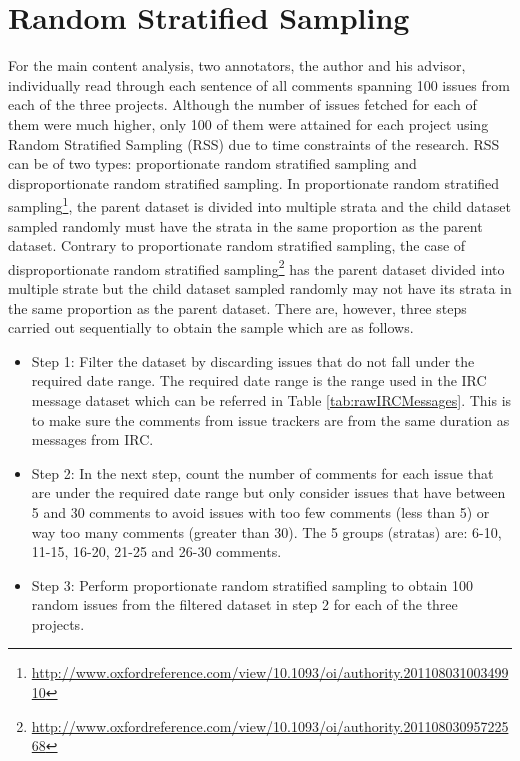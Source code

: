 \documentclass[a4paper,12pt,twoside]{report}
\begin{document}
\section{Random Stratified Sampling}
For the main content analysis, two annotators, the author and his advisor, individually read through each sentence of all comments spanning 100 issues from each of the three projects. Although the number of issues fetched for each of them were much higher, only 100 of them were attained for each project using Random Stratified Sampling (RSS) due to time constraints of the research. RSS can be of two types: proportionate random stratified sampling and disproportionate random stratified sampling. In proportionate random stratified sampling\footnote{\url{http://www.oxfordreference.com/view/10.1093/oi/authority.20110803100349910}}, the parent dataset is divided into multiple strata and the child dataset sampled randomly must have the strata in the same proportion as the parent dataset. Contrary to proportionate random stratified sampling, the case of disproportionate random stratified sampling\footnote{\url{http://www.oxfordreference.com/view/10.1093/oi/authority.20110803095722568}} has the parent dataset divided into multiple strate but the child dataset sampled randomly may not have its strata in the same proportion as the parent dataset. There are, however, three steps carried out sequentially to obtain the sample which are as follows.
\newline 
\begin{itemize}
\item {Step 1:} Filter the dataset by discarding issues that do not fall under the required date range. The required date range is the range used in the \acs{IRC} message dataset which can be referred in Table \ref{tab:rawIRCMessages}. This is to make sure the comments from issue trackers are from the same duration as messages from \acs{IRC}. 
\item {Step 2:} In the next step, count the number of comments for each issue that are under the required date range but only consider issues that have between 5 and 30 comments to avoid issues with too few comments (less than 5) or way too many comments (greater than 30). The 5 groups (stratas) are: 6-10, 11-15, 16-20, 21-25 and 26-30 comments.
\item {Step 3:} Perform proportionate random stratified sampling to obtain 100 random issues from the filtered dataset in step 2 for each of the three projects. 
\end{itemize}
\end{document}
